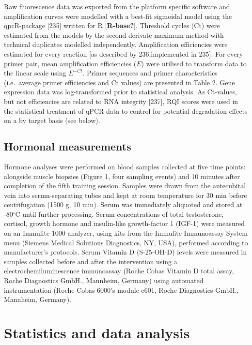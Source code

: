 \documentclass[twoside,10pt]{gihclass} %
\begin{document}
Raw fluorescence data was exported from the platform specific software and amplification curves were modelled with a best-fit sigmoidal model using the qpcR-package {[}235{]} written for R {[}\textbf{R-base?}{]}. Threshold cycles (Ct) were estimated from the models by the second-derivate maximum method with technical duplicates modelled independently.
Amplification efficiencies were estimated for every reaction {[}as described by 236,implemented in 235{]}. For every primer pair, mean amplification efficiencies (\(E\)) were utilised to transform data to the linear scale using \(E^{-Ct}\). Primer sequences and primer characteristics (i.e.~average primer efficiencies and Ct values) are presented in Table 2. Gene expression data was log-transformed prior to statistical analysis. As Ct-values, but not efficiencies are related to RNA integrity {[}237{]}, RQI scores were used in the statistical treatment of qPCR data to control for potential degradation effects on a by target basis (see below).

\hypertarget{hormonal-measurements}{%
\subsection{Hormonal measurements}\label{hormonal-measurements}}

Hormone analyses were performed on blood samples collected at five time points: alongside muscle biopsies (Figure 1, four sampling events) and 10 minutes after completion of the fifth training session. Samples were drawn from the antecubital vein into serum-separating tubes and kept at room temperature for 30 min before centrifugation (1500 g, 10 min). Serum was immediately aliquoted and stored at -80\(^{\circ}\)C until further processing. Serum concentrations of total testosterone, cortisol, growth hormone and insulin-like growth-factor 1 (IGF-1) were measured on an Immulite 1000 analyzer, using kits from the Immulite Immunoassay System menu (Siemens Medical Solutions Diagnostics, NY, USA), performed according to manufacturer's protocols. Serum Vitamin D (S-25-OH-D) levels were measured in samples collected before and after the intervention using a electrochemiluminescence immunoassay (Roche Cobas Vitamin D total assay, Roche Diagnostics GmbH., Mannheim, Germany) using automated instrumentation (Roche Cobas 6000's module e601, Roche Diagnostics GmbH., Mannheim, Germany).

\hypertarget{statistics-and-data-analysis}{%
\section{Statistics and data analysis}\label{statistics-and-data-analysis}}
\end{document}
